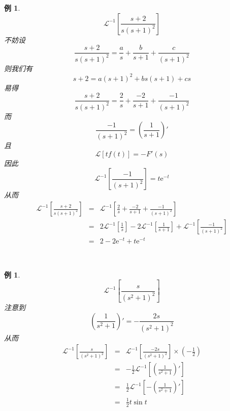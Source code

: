 \documentclass[12pt, a4paper, twoside]{ctexbook}
\newtheorem{example}[theorem]{例}
\begin{document}
\begin{example}
    $$
    \mathscr{L}^{-1}\left[\frac{s+2}{s\left(s+1\right)^2}\right]
    $$
    \hspace*{2em}不妨设
    $$
    \frac{s+2}{s\left(s+1\right)^2}=\frac{a}{s}+\frac{b}{s+1}+\frac{c}{\left(s+1\right)^2}
    $$
    \hspace*{2em}则我们有
    $$
    s+2=a\left(s+1\right)^2+bs\left(s+1\right)+cs
    $$
    \hspace*{2em}易得
    $$
    \frac{s+2}{s\left(s+1\right)^2}=\frac{2}{s}+\frac{-2}{s+1}+\frac{-1}{\left(s+1\right)^2}
    $$
    \hspace*{2em}而
    $$
    \frac{-1}{\left(s+1\right)^2}=\left(\frac{1}{s+1}\right)'
    $$
    \hspace*{2em}且
    $$
    \mathscr{L}\left[tf\left(t\right)\right]=-F'\left(s\right)
    $$
    \hspace*{2em}因此
    $$
    \mathscr{L}^{-1}\left[\frac{-1}{\left(s+1\right)^2}\right]=t\mathrm{e}^{-t}
    $$
    \hspace*{2em}从而
    \begin{eqnarray}
        \mathscr{L}^{-1}\left[\frac{s+2}{s\left(s+1\right)^2}\right]&=&\mathscr{L}^{-1}\left[\frac{2}{s}+\frac{-2}{s+1}+\frac{-1}{\left(s+1\right)^2}\right] \nonumber      \\
        ~&=&2\mathscr{L}^{-1}\left[\frac{1}{s}\right]-2\mathscr{L}^{-1}\left[\frac{1}{s+1}\right]+\mathscr{L}^{-1}\left[\frac{-1}{\left(s+1\right)^2}\right] \nonumber    \\
        ~&=&2-2\mathrm{e}^{-t}+t\mathrm{e}^{-t} \nonumber
    \end{eqnarray}
\end{example}
~\\

\begin{example}
    $$
    \mathscr{L}^{-1}\left[\frac{s}{\left(s^2+1\right)^2}\right]
    $$
    \hspace*{2em}注意到
    $$
    \left(\frac{1}{s^2+1}\right)'=-\frac{2s}{\left(s^2+1\right)^2}
    $$
    \hspace*{2em}从而
    \begin{eqnarray}
        \mathscr{L}^{-1}\left[\frac{s}{\left(s^2+1\right)^2}\right]&=&\mathscr{L}^{-1}\left[\frac{-2s}{\left(s^2+1\right)^2}\right]\times \left(-\frac{1}{2}\right) \nonumber      \\
        ~&=&-\frac{1}{2}\mathscr{L}^{-1}\left[\left(\frac{1}{s^2+1}\right)'\right] \nonumber    \\
        ~&=&\frac{1}{2}\mathscr{L}^{-1}\left[-\left(\frac{1}{s^2+1}\right)'\right] \nonumber    \\
        ~&=&\frac{1}{2} t \sin{t} \nonumber
    \end{eqnarray}
\end{example}
~\\
\end{document}
